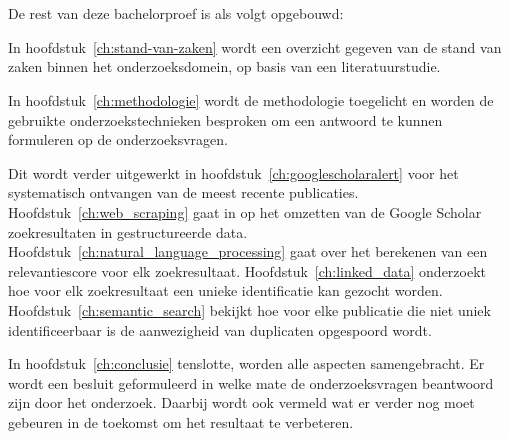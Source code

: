 \section{}%
\label{sec:opzet-bachelorproef}


De rest van deze bachelorproef is als volgt opgebouwd:

In hoofdstuk~\ref{ch:stand-van-zaken} wordt een overzicht gegeven van de stand van zaken binnen het onderzoeksdomein, op basis van een literatuurstudie.

In hoofdstuk~\ref{ch:methodologie} wordt de methodologie toegelicht en worden de gebruikte onderzoekstechnieken besproken om een antwoord te kunnen formuleren op de onderzoeksvragen.

Dit wordt verder uitgewerkt in hoofdstuk~\ref{ch:googlescholaralert} voor het systematisch ontvangen van de meest recente publicaties. Hoofdstuk~\ref{ch:web_scraping} gaat in op het omzetten van de Google Scholar zoekresultaten in gestructureerde data. Hoofdstuk~\ref{ch:natural_language_processing} gaat over het berekenen van een relevantiescore voor elk zoekresultaat. Hoofdstuk~\ref{ch:linked_data} onderzoekt hoe voor elk zoekresultaat een unieke identificatie kan gezocht worden. Hoofdstuk~\ref{ch:semantic_search} bekijkt hoe voor elke publicatie die niet uniek identificeerbaar is de aanwezigheid van duplicaten opgespoord wordt.


In hoofdstuk~\ref{ch:conclusie} tenslotte, worden alle aspecten samengebracht. Er wordt een besluit geformuleerd in welke mate de onderzoeksvragen beantwoord zijn door het onderzoek. Daarbij wordt ook vermeld wat er verder nog moet gebeuren in de toekomst om het resultaat te verbeteren.